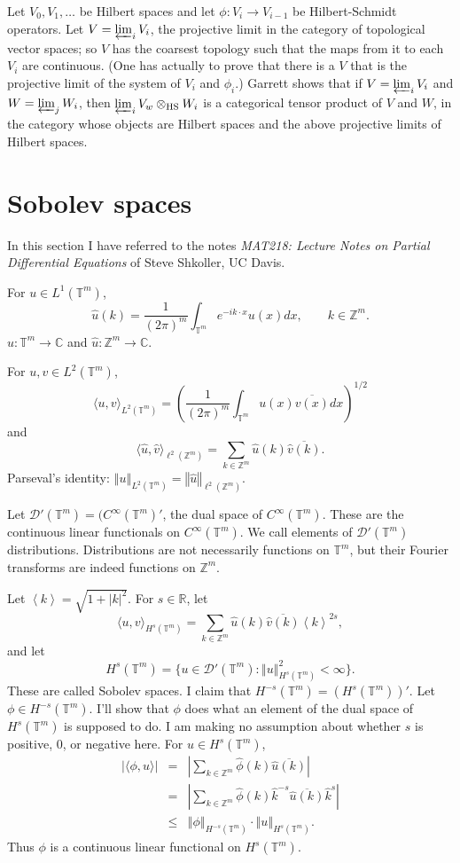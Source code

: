 \documentclass{article}
\newcommand{\inner}[2]{\langle #1, #2 \rangle}
\newcommand{\jap}[1]{\left\langle #1 \right\rangle}
\newcommand{\HS}{\otimes_{\textrm{HS}}}
\newcommand{\norm}[1]{\left\Vert #1 \right\Vert}
\begin{document}
Let $V_0,V_1,\ldots$ be Hilbert spaces and let $\phi:V_i \to V_{i-1}$ be Hilbert-Schmidt operators.
Let $V=\varprojlim_i V_i$, the projective limit in the category
of topological vector spaces; so $V$ has the coarsest topology such that the maps from it to each $V_i$ are continuous. (One has actually to prove that there is a 
$V$ that is the projective limit of the system of $V_i$ and $\phi_i$.) 
Garrett shows that if $V = \varprojlim_i V_i$ and $W=\varprojlim_j W_i$, then $\varprojlim_i V_w \HS W_i$ is a categorical tensor product of
$V$ and $W$, in the category whose objects are Hilbert spaces and the above projective limits of Hilbert spaces. 

\section{Sobolev spaces}
In this section I have referred to the notes {\em MAT218: Lecture Notes on Partial Differential Equations} of
Steve Shkoller, UC Davis.

For $u \in L^1(\mathbb{T}^m)$,
\[
\hat{u}(k)=\frac{1}{(2\pi)^m} \int_{\mathbb{T}^m} e^{-ik\cdot x} u(x) dx, \qquad k \in \mathbb{Z}^m.
\]
$u:\mathbb{T}^m \to \mathbb{C}$ and $\hat{u}:\mathbb{Z}^m \to \mathbb{C}$. 

For $u,v \in L^2(\mathbb{T}^m)$,
\[
\inner{u}{v}_{L^2(\mathbb{T}^m)} = \left( \frac{1}{(2\pi)^m} \int_{\mathbb{T}^m} u(x) \overline{v(x)} dx \right)^{1/2}
\]
and
\[
\inner{\hat{u}}{\hat{v}}_{\ell^2(\mathbb{Z}^m)} = \sum_{k \in \mathbb{Z}^m} \hat{u}(k) \overline{\hat{v}(k)}.
\]
Parseval's identity: $\norm{u}_{L^2(\mathbb{T}^m)}= \norm{\hat{u}}_{\ell^2(\mathbb{Z}^m)}$.

Let $\mathcal{D}'(\mathbb{T}^m)=(C^\infty(\mathbb{T}^m)'$, the dual space of $C^\infty(\mathbb{T}^m)$. These are the continuous linear functionals on $C^\infty(\mathbb{T}^m)$. We call elements of $\mathcal{D}'(\mathbb{T}^m)$ distributions. Distributions are not
necessarily functions on $\mathbb{T}^m$, but their Fourier transforms are indeed functions on $\mathbb{Z}^m$. 

Let $\jap{k}=\sqrt{1+|k|^2}$.
For $s \in \mathbb{R}$, let
\[
\inner{u}{v}_{H^s(\mathbb{T}^m)}=\sum_{k \in \mathbb{Z}^m} \hat{u}(k) \overline{\hat{v}(k)} \jap{k}^{2s},
\]
and let
\[
H^s(\mathbb{T}^m)=\{ u \in \mathcal{D}'(\mathbb{T}^m): \norm{u}^2_{H^s(\mathbb{T}^m)} < \infty\}.
\]
These are called Sobolev spaces. I claim that $H^{-s}(\mathbb{T}^m)=(H^s(\mathbb{T}^m))'$. Let $\phi \in H^{-s}(\mathbb{T}^m)$. I'll show that $\phi$ does what an element of the dual
space of $H^s(\mathbb{T}^m)$ is supposed to do.  I am making no assumption about whether $s$ is positive, 0, or negative here. For $u \in H^s(\mathbb{T}^m)$,
\begin{eqnarray*}
|\inner{\phi}{u}|&=&\left|\sum_{k \in \mathbb{Z}^m} \hat{\phi}(k) \overline{\hat{u}(k)} \right|\\
&=&\left| \sum_{k \in \mathbb{Z}^m} \hat{\phi}(k) \hat{k}^{-s} \overline{\hat{u}(k)} \hat{k}^{s} \right|\\
&\leq&\norm{\phi}_{H^{-s}(\mathbb{T}^m)} \cdot \norm{u}_{H^s(\mathbb{T}^m)}.
\end{eqnarray*}
Thus $\phi$ is a continuous linear functional on $H^s(\mathbb{T}^m)$. 
\end{document}
